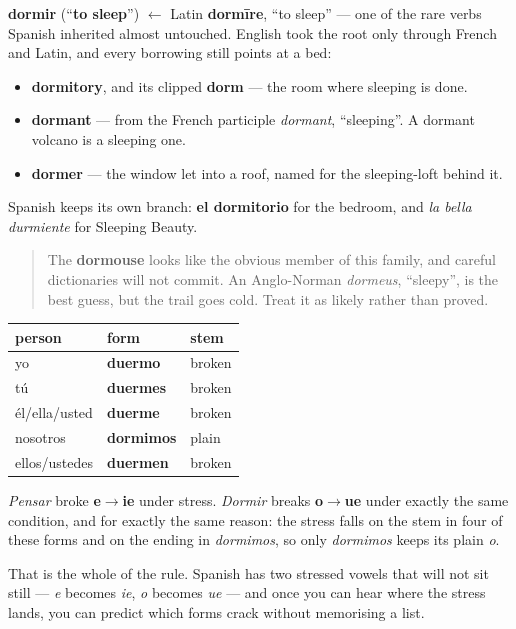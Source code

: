 \begin{cousinweb}
\textbf{dormir} (\textquotedblleft{}\textbf{to sleep}\textquotedblright{}) $\leftarrow$ Latin \textbf{dormīre}, \textquotedblleft{}to sleep\textquotedblright{} — one of the rare verbs Spanish inherited almost untouched. English took the root only through French and Latin, and every borrowing still points at a bed:

\begin{itemize}
\raggedright
  \item \textbf{dormitory}, and its clipped \textbf{dorm} — the room where sleeping is done.
  \item \textbf{dormant} — from the French participle \emph{dormant}, \textquotedblleft{}sleeping\textquotedblright{}. A dormant volcano is a sleeping one.
  \item \textbf{dormer} — the window let into a roof, named for the sleeping-loft behind it.
\end{itemize}

Spanish keeps its own branch: \textbf{el dormitorio} for the bedroom, and \emph{la bella durmiente} for Sleeping Beauty.

\begin{quote}
The \textbf{dormouse} looks like the obvious member of this family, and careful dictionaries will not commit. An Anglo-Norman \emph{dormeus}, \textquotedblleft{}sleepy\textquotedblright{}, is the best guess, but the trail goes cold. Treat it as likely rather than proved.
\end{quote}
\end{cousinweb}

\begin{grammarlens}[title={Grammar Lens: the boot again, with o$\to$ue}]
\noindent
\begin{tabularx}{\linewidth}{@{}>{\raggedright\arraybackslash}X>{\raggedright\arraybackslash}X>{\raggedright\arraybackslash}X@{}}
\toprule
\textbf{person} & \textbf{form} & \textbf{stem} \\
\midrule
yo & \textbf{duermo} & broken \\
tú & \textbf{duermes} & broken \\
él/ella/usted & \textbf{duerme} & broken \\
nosotros & \textbf{dormimos} & plain \\
ellos/ustedes & \textbf{duermen} & broken \\
\bottomrule
\end{tabularx}

\emph{Pensar} broke \textbf{e$\to$ie} under stress. \emph{Dormir} breaks \textbf{o$\to$ue} under exactly the same condition, and for exactly the same reason: the stress falls on the stem in four of these forms and on the ending in \emph{dormimos}, so only \emph{dormimos} keeps its plain \emph{o}.

That is the whole of the rule. Spanish has two stressed vowels that will not sit still — \emph{e} becomes \emph{ie}, \emph{o} becomes \emph{ue} — and once you can hear where the stress lands, you can predict which forms crack without memorising a list.
\end{grammarlens}


